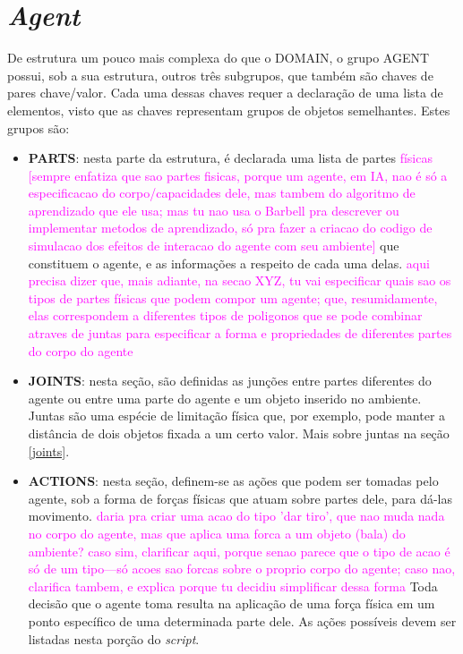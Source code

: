 \documentclass[cic,tc]{iiufrgs}
\newcommand\bruno[1]{\textcolor{magenta}{#1}}
\begin{document}
\section{\textit{Agent}}
De estrutura um pouco mais complexa do que o DOMAIN, o grupo AGENT possui, sob a sua estrutura, outros três subgrupos, que também são chaves de pares chave/valor.
Cada uma dessas chaves requer a declaração de uma lista de elementos, visto que as chaves representam grupos de objetos semelhantes. Estes grupos são:
\begin{itemize}
  \item \textbf{PARTS}: nesta parte da estrutura, é declarada uma lista de partes \bruno{físicas [sempre enfatiza que sao partes fisicas, porque um agente, em IA, nao é só a especificacao do corpo/capacidades dele, mas tambem do algoritmo de aprendizado que ele usa; mas tu nao usa o Barbell pra descrever ou implementar metodos de aprendizado, só pra fazer a criacao do codigo de simulacao dos efeitos de interacao do agente com seu ambiente]} que constituem o agente, e as informações a respeito de cada uma delas. \bruno{aqui precisa dizer que, mais adiante, na secao XYZ, tu vai especificar quais sao os tipos de partes físicas que podem compor um agente; que, resumidamente, elas correspondem a diferentes tipos de poligonos que se pode combinar atraves de juntas para especificar a forma e propriedades de diferentes partes do corpo do agente}
  \item \textbf{JOINTS}: nesta seção, são definidas as junções entre partes diferentes do agente ou entre uma parte do agente e um objeto inserido no ambiente. Juntas
  são uma espécie de limitação física que, por exemplo, pode manter a distância de dois objetos fixada a um certo valor. Mais sobre juntas na seção \ref{joints}.
  \item \textbf{ACTIONS}: nesta seção, definem-se as ações que podem ser tomadas pelo agente, sob a forma de forças físicas que atuam sobre partes dele,
  para dá-las movimento. \bruno{daria pra criar uma acao do tipo 'dar tiro', que nao muda nada no corpo do agente, mas que aplica uma forca a um objeto (bala) do ambiente? caso sim, clarificar aqui, porque senao parece que o tipo de acao é só de um tipo---só acoes sao forcas sobre o proprio corpo do agente; caso nao, clarifica tambem, e explica porque tu decidiu simplificar dessa forma} Toda decisão que o agente toma resulta na aplicação de uma força física em um ponto específico de uma determinada parte dele. As ações
  possíveis devem ser listadas nesta porção do \textit{script}.
\end{itemize}
\end{document}
